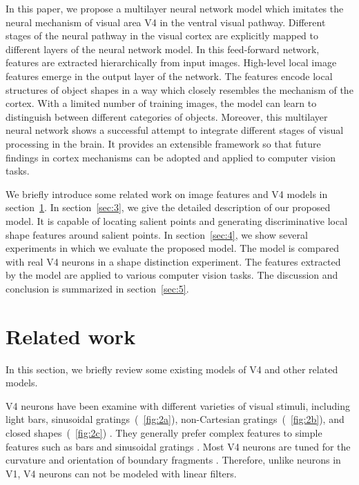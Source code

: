 \documentclass[9pt,twocolumn]{article}
\begin{document}
In this paper, we propose a multilayer neural network model which imitates the neural mechanism of visual area V4 in the ventral visual pathway.
Different stages of the neural pathway in the visual cortex are explicitly mapped to different layers of the neural network model.
In this feed-forward network, features are extracted hierarchically from input images.
High-level local image features emerge in the output layer of the network. 
The features encode local structures of object shapes in a way which closely resembles the mechanism of the cortex.
With a limited number of training images, the model can learn to distinguish between different categories of objects.
Moreover, this multilayer neural network shows a successful attempt to integrate different stages of visual processing in the brain. 
It provides an extensible framework so that future findings in cortex mechanisms can be adopted and applied to computer vision tasks.

We briefly introduce some related work on image features and V4 models in section~\ref{sec:2}.
In section~\ref{sec:3}, we give the detailed description of our proposed model.
It is capable of locating salient points and generating discriminative local shape features around salient points.
In section~\ref{sec:4}, we show several experiments in which we evaluate the proposed model.
The model is compared with real V4 neurons in a shape distinction experiment.
The features extracted by the model are applied to various computer vision tasks.
The discussion and conclusion is summarized in section~\ref{sec:5}.

\section{Related work}\label{sec:2}

In this section, we briefly review some existing models of V4 and other related models.

V4 neurons have been examine with different varieties of visual stimuli, including light bars, sinusoidal gratings~(\figurename~\ref{fig:2a}),
non-Cartesian gratings~(\figurename~\ref{fig:2b}), and closed shapes~(\figurename~\ref{fig:2c}) \cite{gallant1996,pasupathy2001}.
They generally prefer complex features to simple features such as bars and sinusoidal gratings \cite{gallant1996}.
Most V4 neurons are tuned for the curvature and orientation of boundary fragments \cite{pasupathy2001}.
Therefore, unlike neurons in V1, V4 neurons can not be modeled with linear filters.
\end{document}
